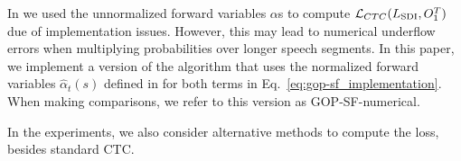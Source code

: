 In \cite{cao24b_interspeech} we used the unnormalized forward variables $\alpha$s to compute $\mathcal{L}_{CTC}(L_{\text{SDI}}, O_{1}^{T})$ due of implementation issues.
However, this may lead to numerical underflow errors when multiplying probabilities over longer speech segments.
In this paper, we implement a version of the algorithm that uses the normalized forward variables $\hat{\alpha}_{t}(s)$ defined in \cite{CTC} for both terms in Eq.~\ref{eq:gop-sf_implementation}.
When making comparisons, we refer to this version as GOP-SF-numerical.

In the experiments, we also consider alternative methods to compute the loss, besides standard CTC.

%



